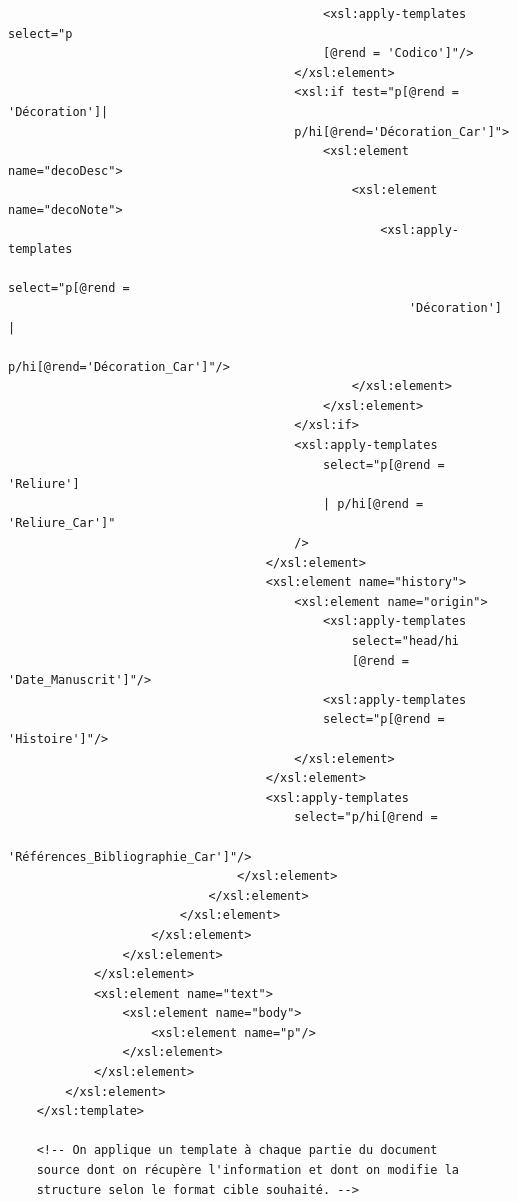 \documentclass[a4paper,12pt,twoside]{book}
\begin{document}
\begin{verbatim}
                                            <xsl:apply-templates select="p
                                            [@rend = 'Codico']"/>
                                        </xsl:element>
                                        <xsl:if test="p[@rend = 'Décoration']|
                                        p/hi[@rend='Décoration_Car']">
                                            <xsl:element name="decoDesc">
                                                <xsl:element name="decoNote">
                                                    <xsl:apply-templates
                                                        select="p[@rend = 
                                                        'Décoration'] |  
                                                p/hi[@rend='Décoration_Car']"/>
                                                </xsl:element>
                                            </xsl:element>
                                        </xsl:if>
                                        <xsl:apply-templates
                                            select="p[@rend = 'Reliure'] 
                                            | p/hi[@rend = 'Reliure_Car']"
                                        />
                                    </xsl:element>
                                    <xsl:element name="history">
                                        <xsl:element name="origin">
                                            <xsl:apply-templates
                                                select="head/hi
                                                [@rend = 'Date_Manuscrit']"/>
                                            <xsl:apply-templates 
                                            select="p[@rend = 'Histoire']"/>
                                        </xsl:element>
                                    </xsl:element>
                                    <xsl:apply-templates
                                        select="p/hi[@rend = 
                                        'Références_Bibliographie_Car']"/>
                                </xsl:element>
                            </xsl:element>
                        </xsl:element>
                    </xsl:element>
                </xsl:element>
            </xsl:element>
            <xsl:element name="text">
                <xsl:element name="body">
                    <xsl:element name="p"/>
                </xsl:element>
            </xsl:element>
        </xsl:element>
    </xsl:template>

    <!-- On applique un template à chaque partie du document 
    source dont on récupère l'information et dont on modifie la 
    structure selon le format cible souhaité. -->


\end{verbatim}
\end{document}
